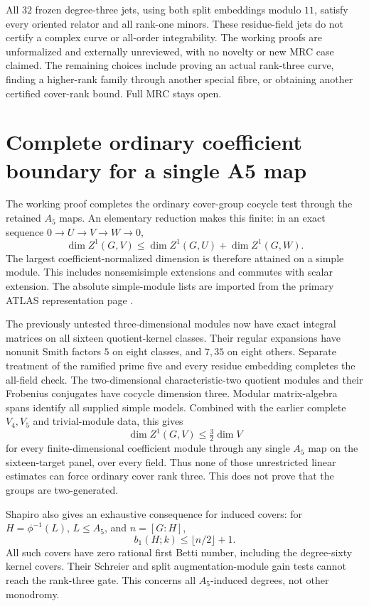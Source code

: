 \documentclass[11pt]{article}
\begin{document}
All $32$ frozen degree-three jets, using both split embeddings
modulo $11$, satisfy every oriented relator and all rank-one
minors. These residue-field jets do not certify a complex curve or
all-order integrability. The working proofs are unformalized and
externally unreviewed, with no novelty or new MRC case claimed.
The remaining choices include proving an actual rank-three curve,
finding a higher-rank family through another special fibre, or
obtaining another certified cover-rank bound. Full MRC stays open.

\clearpage
\section{Complete ordinary coefficient boundary for a single A5 map}

The working proof
 completes the
ordinary cover-group cocycle test through the retained $A_5$ maps.
An elementary reduction makes this finite: in an exact sequence
$0\to U\to V\to W\to0$,
\[
 \dim Z^1(G,V)\le\dim Z^1(G,U)+\dim Z^1(G,W).
\]
The largest coefficient-normalized dimension is therefore attained
on a simple module. This includes nonsemisimple extensions and
commutes with scalar extension. The absolute simple-module lists
are imported from the primary ATLAS representation page \cite{atlas}.

The previously untested three-dimensional modules now have exact
integral matrices on all sixteen quotient-kernel classes. Their
regular expansions have nonunit Smith factors $5$ on eight classes,
and $7,35$ on eight others. Separate treatment of the ramified prime
five and every residue embedding completes the all-field check.
The two-dimensional characteristic-two quotient modules and their
Frobenius conjugates have cocycle dimension three. Modular
matrix-algebra spans identify all supplied simple models. Combined
with the earlier complete $V_4,V_5$ and trivial-module data, this gives
\[
 \dim Z^1(G,V)\le\tfrac32\dim V
\]
for every finite-dimensional coefficient module through any single
$A_5$ map on the sixteen-target panel, over every field. Thus none
of those unrestricted linear estimates can force ordinary cover
rank three. This does not prove that the groups are two-generated.

Shapiro also gives an exhaustive consequence for induced covers:
for $H=\phi^{-1}(L)$, $L\le A_5$, and $n=[G:H]$,
\[
 b_1(H;k)\le\lfloor n/2\rfloor+1.
\]
All such covers have zero rational first Betti number, including
the degree-sixty kernel covers. Their Schreier and split
augmentation-module gain tests cannot reach the rank-three gate.
This concerns all $A_5$-induced degrees, not other monodromy.
\end{document}
